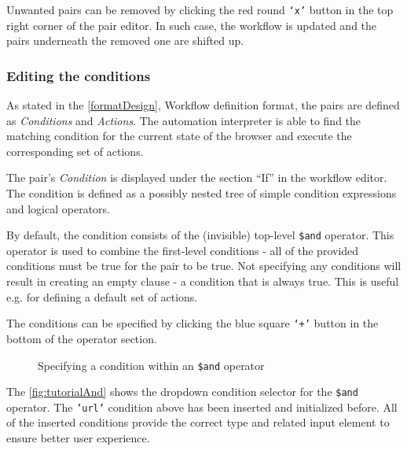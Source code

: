 Unwanted pairs can be removed by clicking the red round \texttt{`x'} button in the top right corner of the pair editor.
In such case, the workflow is updated and the pairs underneath the removed one are shifted up.
\clearpage
\subsubsection{Editing the conditions}

As stated in the \autoref{formatDesign}, Workflow definition format, the pairs are defined as \textit{Conditions} and \textit{Actions}.
The automation interpreter is able to find the matching condition for the current state of the browser and execute the corresponding set of actions.

The pair's \textit{Condition} is displayed under the section ``If'' in the workflow editor.
The condition is defined as a possibly nested tree of simple condition expressions and logical operators.

By default, the condition consists of the (invisible) top-level \texttt{\$and} operator.
This operator is used to combine the first-level conditions - all of the provided conditions must be true for the pair to be true.
Not specifying any conditions will result in creating an empty clause - a condition that is always true.
This is useful e.g. for defining a default set of actions.

The conditions can be specified by clicking the blue square \texttt{`+'} button in the bottom of the operator section.

\begin{figure}[!h]
    \begin{center}
    \end{center}
    \caption{Specifying a condition within an \texttt{\$and} operator} \label{fig:tutorialAnd}
\end{figure}

The \autoref{fig:tutorialAnd} shows the dropdown condition selector for the \texttt{\$and} operator.
The \texttt{'url'} condition above has been inserted and initialized before.
All of the inserted conditions provide the correct type and related input element to ensure better user experience.

